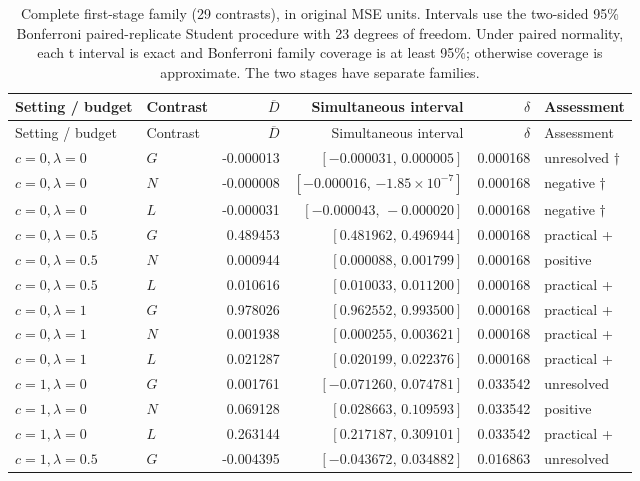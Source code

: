 \begingroup\small\setlength{\tabcolsep}{3pt}
\begin{longtable}{llrrrl}
\caption{Complete first-stage family (29 contrasts), in original MSE units. Intervals use the two-sided 95\% Bonferroni paired-replicate Student procedure with 23 degrees of freedom. Under paired normality, each t interval is exact and Bonferroni family coverage is at least 95\%; otherwise coverage is approximate. The two stages have separate families.}\label{tab:all-stageone}\\
\toprule
Setting / budget & Contrast & $\overline D$ & Simultaneous interval & $\delta$ & Assessment \\
\midrule
\endfirsthead
\toprule
Setting / budget & Contrast & $\overline D$ & Simultaneous interval & $\delta$ & Assessment \\
\midrule
\endhead
\bottomrule\endfoot
$c=0,\lambda=0$ & $G$ & -0.000013 & $[-0.000031,\,0.000005]$ & 0.000168 & unresolved $\dagger$ \\
$c=0,\lambda=0$ & $N$ & -0.000008 & $[-0.000016,\,\ensuremath{-1.85\times10^{-7}}]$ & 0.000168 & negative $\dagger$ \\
$c=0,\lambda=0$ & $L$ & -0.000031 & $[-0.000043,\,-0.000020]$ & 0.000168 & negative $\dagger$ \\
$c=0,\lambda=0.5$ & $G$ & 0.489453 & $[0.481962,\,0.496944]$ & 0.000168 & practical + \\
$c=0,\lambda=0.5$ & $N$ & 0.000944 & $[0.000088,\,0.001799]$ & 0.000168 & positive \\
$c=0,\lambda=0.5$ & $L$ & 0.010616 & $[0.010033,\,0.011200]$ & 0.000168 & practical + \\
$c=0,\lambda=1$ & $G$ & 0.978026 & $[0.962552,\,0.993500]$ & 0.000168 & practical + \\
$c=0,\lambda=1$ & $N$ & 0.001938 & $[0.000255,\,0.003621]$ & 0.000168 & practical + \\
$c=0,\lambda=1$ & $L$ & 0.021287 & $[0.020199,\,0.022376]$ & 0.000168 & practical + \\
$c=1,\lambda=0$ & $G$ & 0.001761 & $[-0.071260,\,0.074781]$ & 0.033542 & unresolved \\
$c=1,\lambda=0$ & $N$ & 0.069128 & $[0.028663,\,0.109593]$ & 0.033542 & positive \\
$c=1,\lambda=0$ & $L$ & 0.263144 & $[0.217187,\,0.309101]$ & 0.033542 & practical + \\
$c=1,\lambda=0.5$ & $G$ & -0.004395 & $[-0.043672,\,0.034882]$ & 0.016863 & unresolved \\

\end{longtable}
